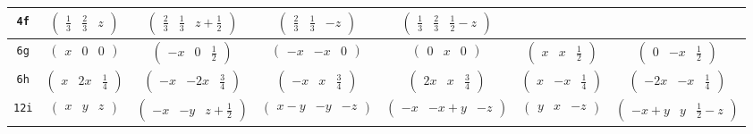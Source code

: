 \documentclass[fleqn,9pt,landscape]{jsarticle}
\begin{document}
\begin{center}
\begin{longtable}{ccccccc}
{\tt 4f} & $ \begin{pmatrix} \frac{1}{3} & \frac{2}{3} & z \end{pmatrix} $ & $ \begin{pmatrix} \frac{2}{3} & \frac{1}{3} & z + \frac{1}{2} \end{pmatrix} $ & $ \begin{pmatrix} \frac{2}{3} & \frac{1}{3} & - z \end{pmatrix} $ & $ \begin{pmatrix} \frac{1}{3} & \frac{2}{3} & \frac{1}{2} - z \end{pmatrix} $ & $  $ & $  $ \\ \hline
{\tt 6g} & $ \begin{pmatrix} x & 0 & 0 \end{pmatrix} $ & $ \begin{pmatrix} - x & 0 & \frac{1}{2} \end{pmatrix} $ & $ \begin{pmatrix} - x & - x & 0 \end{pmatrix} $ & $ \begin{pmatrix} 0 & x & 0 \end{pmatrix} $ & $ \begin{pmatrix} x & x & \frac{1}{2} \end{pmatrix} $ & $ \begin{pmatrix} 0 & - x & \frac{1}{2} \end{pmatrix} $ \\ \hline
{\tt 6h} & $ \begin{pmatrix} x & 2 x & \frac{1}{4} \end{pmatrix} $ & $ \begin{pmatrix} - x & - 2 x & \frac{3}{4} \end{pmatrix} $ & $ \begin{pmatrix} - x & x & \frac{3}{4} \end{pmatrix} $ & $ \begin{pmatrix} 2 x & x & \frac{3}{4} \end{pmatrix} $ & $ \begin{pmatrix} x & - x & \frac{1}{4} \end{pmatrix} $ & $ \begin{pmatrix} - 2 x & - x & \frac{1}{4} \end{pmatrix} $ \\ \hline
{\tt 12i} & $ \begin{pmatrix} x & y & z \end{pmatrix} $ & $ \begin{pmatrix} - x & - y & z + \frac{1}{2} \end{pmatrix} $ & $ \begin{pmatrix} x - y & - y & - z \end{pmatrix} $ & $ \begin{pmatrix} - x & - x + y & - z \end{pmatrix} $ & $ \begin{pmatrix} y & x & - z \end{pmatrix} $ & $ \begin{pmatrix} - x + y & y & \frac{1}{2} - z \end{pmatrix} $ \\

\end{longtable}
\end{center}
\end{document}
